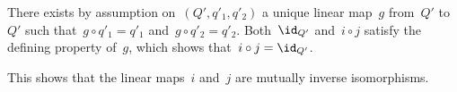 There exists by assumption on~$(Q', q'_1, q'_2)$ a unique linear map~$g$ from~$Q'$ to~$Q'$ such that~$g \circ q'_1 = q'_1$ and~$g \circ q'_2 = q'_2$.
Both~$\id_{Q'}$ and~$i \circ j$ satisfy the defining property of~$g$, which shows that~$i \circ j = \id_{Q'}$.

This shows that the linear maps~$i$ and~$j$ are mutually inverse isomorphisms.








